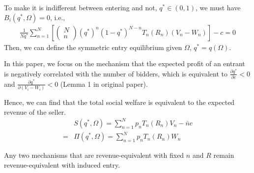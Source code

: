 \documentclass[11pt]{elegantbook}
\begin{document}
To make it is indifferent between entering and not, $q^*\in (0,1)$, we must have $B_i(q^*,\Omega)=0$, i.e.,
\begin{equation}
    \begin{aligned}
        \frac{1}{Nq^*}\sum_{n=1}^N\left[
            \begin{pmatrix}
            N\\
            n
        \end{pmatrix}
        (q^*)^{n}(1-q^*)^{N-n}T_n(R_n)\left(V_n-W_n\right)
        \right]-c=0
    \end{aligned}
    \label{EAE_2}
\end{equation}
Then, we can define the symmetric entry equilibrium given $\Omega$, $q^*=q(\Omega)$.
\begin{assumption}
    In this paper, we focus on the mechanism that the expected profit of an entrant is negatively correlated with the number of bidders, which is equivalent to $\frac{\partial q^*}{\partial c}<0$ and $\frac{\partial q^*}{\partial (V_i-W_i)}<0$ (Lemma 1 in original paper).
\end{assumption}

Hence, we can find that the total social welfare is equivalent to the expected revenue of the seller.
\begin{equation}
    \begin{aligned}
        &S(q^*,\Omega)=\sum_{n=1}^N p_n T_n(R_n)V_n-\bar{n}c\\
        =&\Pi(q^*,\Omega)=\sum_{n=1}^N p_n T_n(R_n)W_n
    \end{aligned}
    \nonumber
\end{equation}

\begin{proposition}
    Any two mechanisms that are revenue-equivalent with fixed $n$ and $R$ remain revenue-equivalent with induced entry.
\end{proposition}
\end{document}
